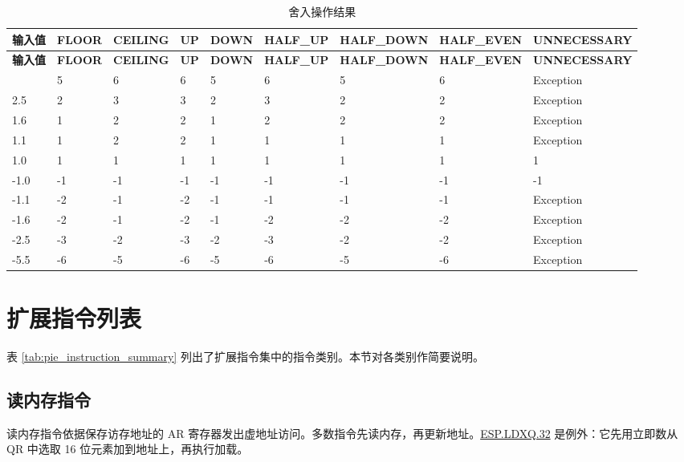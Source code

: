 \documentclass[main\_\_CN.tex]{subfiles}
\begin{document}
\begin{longtable}[c]{|l|l|l|l|l|l|l|l|l|}
    \caption{舍入操作结果}
    \label{tab:ESP-rounding-mode-results}\\
    \hline
    \rowcolor{lightgray}
    \textbf{输入值} & \textbf{FLOOR} & \textbf{CEILING} & \textbf{UP} & \textbf{DOWN}  & \textbf{HALF\_UP} & \textbf{HALF\_DOWN} & \textbf{HALF\_EVEN} & \textbf{UNNECESSARY}\\\hline
    \endfirsthead
    \rowcolor{lightgray}
        \textbf{输入值} & \textbf{FLOOR} & \textbf{CEILING} & \textbf{UP} & \textbf{DOWN}  & \textbf{HALF\_UP} & \textbf{HALF\_DOWN} & \textbf{HALF\_EVEN} & \textbf{UNNECESSARY} \\\hline
    \endhead
    \endfoot
    5.5 & 5 & 6& 6 &5 & 6 & 5 & 6 & Exception \\\hline
    2.5 & 2 & 3& 3& 2& 3& 2& 2& Exception \\\hline
    1.6 & 1 & 2& 2& 1& 2& 2& 2& Exception \\\hline
    1.1 & 1 & 2& 2& 1& 1& 1& 1& Exception \\\hline
    1.0 & 1 & 1& 1& 1& 1& 1& 1& 1 \\\hline
    -1.0 & -1 & -1 & -1 & -1 & -1 & -1 & -1 & -1 \\\hline
    -1.1 & -2 & -1 & -2 & -1 & -1 & -1 & -1 & Exception \\\hline
    -1.6 & -2 & -1 &-2 & -1 & -2 & -2& -2& Exception \\\hline
    -2.5 & -3 & -2 & -3 & -2 & -3 & -2 & -2 & Exception \\\hline
    -5.5 & -6 & -5 & -6 & -5 & -6 & -5 & -6 & Exception \\\hline
\end{longtable}

\section{扩展指令列表}\label{sec:pie-instruction-simple-introduction}

表 \ref{tab:pie_instruction_summary} 列出了扩展指令集中的指令类别。本节对各类别作简要说明。


\newpage


\subsection{读内存指令}
\label{sec:pie-load-instructions}

读内存指令依据保存访存地址的 AR 寄存器发出虚地址访问。多数指令先读内存，再更新地址。\hyperref[instruction:ESPLDXQ32]{ESP.LDXQ.32} 是例外：它先用立即数从 QR 中选取 16 位元素加到地址上，再执行加载。
\end{document}
